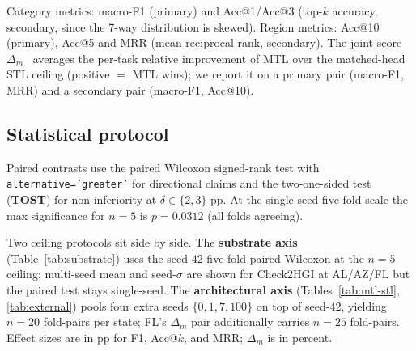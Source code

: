 Category metrics: macro-F1 (primary) and Acc@1/Acc@3 (top-$k$ accuracy, secondary, since the 7-way distribution is skewed). Region metrics: Acc@10 (primary), Acc@5 and MRR (mean reciprocal rank, secondary). The joint score $\Delta_m$~\cite{maninis2019attentive,vandenhende2022mtl} averages the per-task relative improvement of MTL over the matched-head STL ceiling (positive $=$ MTL wins); we report it on a primary pair (macro-F1, MRR) and a secondary pair (macro-F1, Acc@10).

\subsection{Statistical protocol}
\label{subsec:setup-stats}

Paired contrasts use the paired Wilcoxon signed-rank test with \texttt{alternative='greater'} for directional claims and the two-one-sided test (\textbf{TOST}) for non-inferiority at $\delta\in\{2,3\}$ pp. At the single-seed five-fold scale the max significance for $n=5$ is $p=0.0312$ (all folds agreeing).

Two ceiling protocols sit side by side. The \textbf{substrate axis} (Table~\ref{tab:substrate}) uses the seed-42 five-fold paired Wilcoxon at the $n=5$ ceiling; multi-seed mean and seed-$\sigma$ are shown for Check2HGI at AL/AZ/FL but the paired test stays single-seed. The \textbf{architectural axis} (Tables~\ref{tab:mtl-stl}, \ref{tab:external}) pools four extra seeds $\{0,1,7,100\}$ on top of seed-42, yielding $n=20$ fold-pairs per state; FL's $\Delta_m$ pair additionally carries $n=25$ fold-pairs. Effect sizes are in pp for F1, Acc@$k$, and MRR; $\Delta_m$ is in percent.
